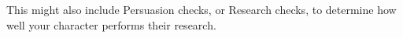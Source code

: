 This might also include Persuasion checks, or Research checks, to determine how well your character performs their research. 
 






